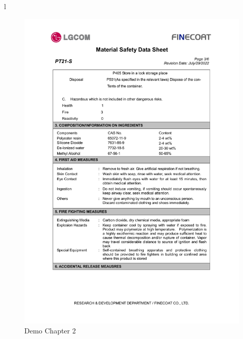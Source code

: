 l\documentclass[a4paper,12pt,twoside]{report}
\begin{document}
\begin{figure}[H]
		\includegraphics[width=\textwidth, keepaspectratio]{images/chaps3}
	\caption[Demo Chapter 2 .ctd]{Demo Chapter 2}
\label{chaps3}
\end{figure}

\newpage
\end{document}
